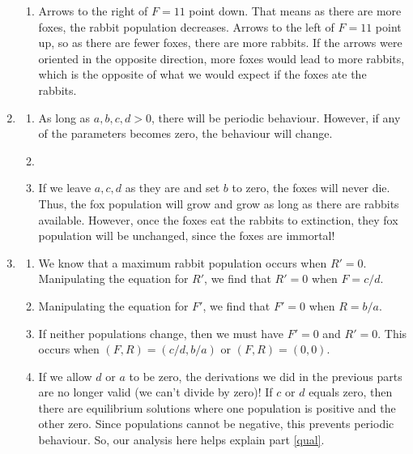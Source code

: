 \begin{enumerate}
\begin{enumerate}
				\item Arrows to the right of $F=11$ point down. That means as there are more foxes, the rabbit population decreases.
				Arrows to the left of $F=11$ point up, so as there are fewer foxes, there are more rabbits. If the arrows were oriented in the opposite direction,
				more foxes would lead to more rabbits, which is the opposite of what we would expect if the foxes ate the rabbits.
			\end{enumerate}
			\item \begin{enumerate}
				\item As long as $a,b,c,d>0$, there will be periodic behaviour.
				However, if any of the parameters becomes zero, the behaviour will change.
				\item 
				\item If we leave $a,c,d$ as they are and set $b$ to zero, the foxes will never die.
				Thus, the fox population will grow and grow as long as there are rabbits available. However,
				once the foxes eat the rabbits to extinction, they fox population will be unchanged, since the foxes are
				immortal!
			\end{enumerate}
			\item \begin{enumerate}
				\item We know that a maximum rabbit population occurs when $R'=0$. Manipulating the equation for
				$R'$, we find that $R'=0$ when $F=c/d$.
				\item Manipulating the equation for $F'$, we find that $F'=0$ when $R=b/a$.
				\item If neither populations change, then we must have $F'=0$ and $R'=0$. This occurs when
				$(F,R)=(c/d, b/a)$ or $(F,R)=(0,0)$.
				\item If we allow $d$ or $a$ to be zero, the derivations we did in the previous parts
				are no longer valid (we can't divide by zero)! If $c$ or $d$ equals zero, then there are equilibrium solutions
				where one population is positive and the other zero. Since populations cannot be negative, this prevents
				periodic behaviour. So, our analysis here helps explain part \ref{qual}.
			\end{enumerate}
		\end{enumerate}
